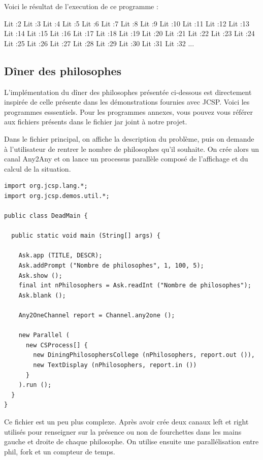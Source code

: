 \documentclass[a4paper,11pt,french]{report}
\begin{document}
Voici le résultat de l'execution de ce programme :

Lit :2
Lit :3
Lit :4
Lit :5
Lit :6
Lit :7
Lit :8
Lit :9
Lit :10
Lit :11
Lit :12
Lit :13
Lit :14
Lit :15
Lit :16
Lit :17
Lit :18
Lit :19
Lit :20
Lit :21
Lit :22
Lit :23
Lit :24
Lit :25
Lit :26
Lit :27
Lit :28
Lit :29
Lit :30
Lit :31
Lit :32
...
 
\subsection{Dîner des philosophes}

L'implémentation du dîner des philosophes présentée ci-dessous est directement inspirée de celle présente dans les démonstrations fournies avec JCSP. Voici les programmes esssentiels. Pour les programmes annexes, vous pouvez vous référer aux fichiers présents dans le fichier jar joint à notre projet.

Dans le fichier principal, on affiche la description du problème, puis on demande à l'utilisateur de rentrer le nombre de philosophes qu'il souhaite. On crée alors un canal Any2Any et on lance un processus parallèle composé de l'affichage et du calcul de la situation.

\begin{lstlisting}[frame=trBL,title={Dîner des philosophes : DeadMain.java}]
import org.jcsp.lang.*;
import org.jcsp.demos.util.*;

public class DeadMain {

  public static void main (String[] args) {

  	Ask.app (TITLE, DESCR);
  	Ask.addPrompt ("Nombre de philosophes", 1, 100, 5);
  	Ask.show ();
  	final int nPhilosophers = Ask.readInt ("Nombre de philosophes");
  	Ask.blank ();

    Any2OneChannel report = Channel.any2one ();

    new Parallel (
      new CSProcess[] {
        new DiningPhilosophersCollege (nPhilosophers, report.out ()),
        new TextDisplay (nPhilosophers, report.in ())
      }
    ).run ();
  }
}
\end{lstlisting}

Ce fichier est un peu plus complexe. Après avoir crée deux canaux left et right utilisés pour renseigner sur la présence ou non de fourchettes dans les mains gauche et droite de chaque philosophe. On utilise ensuite une parallélisation entre phil, fork et un compteur de temps.
\end{document}
